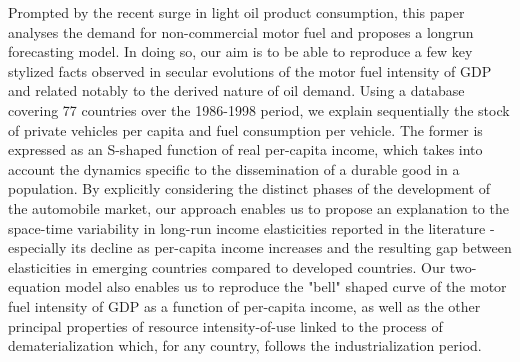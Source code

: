 Prompted by the recent surge in light oil product consumption, this paper analyses the demand for non-commercial motor fuel and proposes a longrun forecasting model. In doing so, our aim is to be able to reproduce a few key stylized facts observed in secular evolutions of the motor fuel intensity of GDP and related notably to the derived nature of oil demand. Using a database covering 77 countries over the 1986-1998 period, we explain sequentially the stock of private vehicles per capita and fuel consumption per vehicle. The former is expressed as an S-shaped function of real per-capita income, which takes into account the dynamics specific to the dissemination of a durable good in a population. By explicitly considering the distinct phases of the development of the automobile market, our approach enables us to propose an explanation to the space-time variability in long-run income elasticities reported in the literature - especially its decline as per-capita income increases and the resulting gap between elasticities in emerging countries compared to developed countries. Our two-equation model also enables us to reproduce the "bell" shaped curve of the motor fuel intensity of GDP as a function of per-capita income, as well as the other principal properties of resource intensity-of-use linked to the process of dematerialization which, for any country, follows the industrialization period.